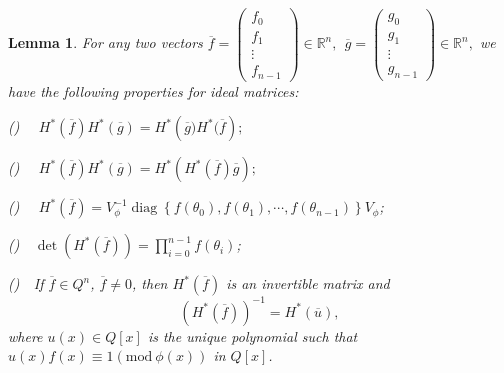 \documentclass [11pt]{article}
\newtheorem{lem}[thm]{\bf Lemma}
\begin{document}
\begin{lem} \label{lm2.4}
For any two vectors $
\overline{f}=\left(\begin{array}{c}
f_{0} \\
f_{1} \\
\vdots \\
f_{n-1}
\end{array}\right)\in \mathbb{R}^{n},\ \ \overline{g}=\left(\begin{array}{c}
g_{0} \\
g_{1} \\
\vdots \\
g_{n-1}
\end{array}\right)\in \mathbb{R}^{n},
$
we have the following properties for ideal matrices:

 () \ \ $H^{*}(\overline{f}) H^{*}(\overline{g})=H^{*}\left(\overline{g}) H^{*}(\overline{f}\right) ;$

 () \ \ $H^{*}(\overline{f}) H^{*}(\overline{g})=H^{*}( H^{*}(\overline{f}) \overline{g}) ;$

 () \ \  $H^{*}(\overline{f})=V_{\phi}^{-1} \operatorname{diag}\left\{f\left(\theta_{0}\right), f\left(\theta_{1}\right), \cdots, f\left(\theta_{n-1}\right)\right\} V_{\phi}$;

 ()\ \  $\operatorname{det}\left(H^{*}(\overline{f})\right)=\prod_{i=0}^{n-1} f\left(\theta_{i}\right)$;

 ()\ \  If $\overline{f} \in Q^{n}$,  $\overline{f} \neq 0$, then $H^{*}(\overline{f})$ is an invertible matrix and
$$
\left(H^{*}(\overline{f})\right)^{-1}=H^{*}(\overline{u}),
$$
where $u(x) \in Q[x]$ is the unique polynomial such that
$u(x) f(x) \equiv 1 (\text{mod}\  \phi(x))$ in $Q[x]$.
\end{lem}
\end{document}
